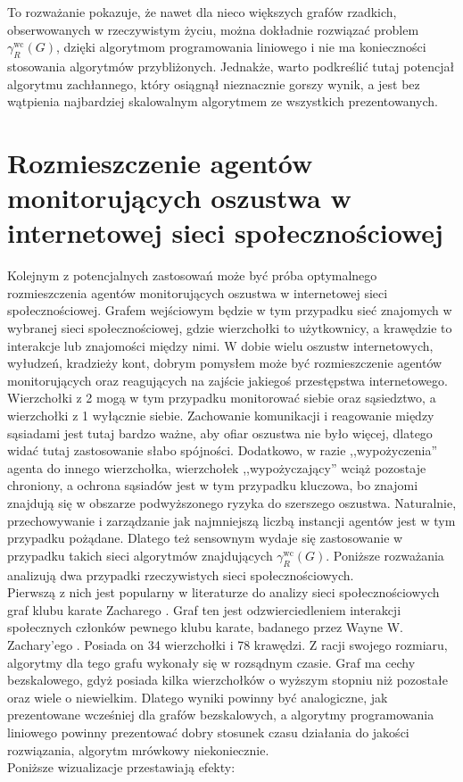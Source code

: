 To rozważanie pokazuje, że nawet dla nieco większych grafów rzadkich, obserwowanych w rzeczywistym życiu, można dokładnie rozwiązać problem $\gamma^{\text{wc}}_R(G)$, dzięki algorytmom programowania liniowego i nie ma konieczności stosowania algorytmów przybliżonych. Jednakże, warto podkreślić tutaj potencjał algorytmu zachłannego, który osiągnął nieznacznie gorszy wynik, a jest bez wątpienia najbardziej skalowalnym algorytmem ze wszystkich prezentowanych.

\section{Rozmieszczenie agentów monitorujących oszustwa w internetowej sieci społecznościowej}

Kolejnym z potencjalnych zastosowań może być próba optymalnego rozmieszczenia agentów monitorujących oszustwa w internetowej sieci społecznościowej. Grafem wejściowym będzie w tym przypadku sieć znajomych w wybranej sieci społecznościowej, gdzie wierzchołki to użytkownicy, a krawędzie to interakcje lub znajomości między nimi. W dobie wielu oszustw internetowych, wyłudzeń, kradzieży kont, dobrym pomysłem może być rozmieszczenie agentów monitorujących oraz reagujących na zajście jakiegoś przestępstwa internetowego. Wierzchołki z 2 mogą w tym przypadku monitorować siebie oraz sąsiedztwo, a wierzchołki z 1 wyłącznie siebie. Zachowanie komunikacji i reagowanie między sąsiadami jest tutaj bardzo ważne, aby ofiar oszustwa nie było więcej, dlatego widać tutaj zastosowanie słabo spójności. Dodatkowo, w razie ,,wypożyczenia'' agenta do innego wierzchołka, wierzchołek ,,wypożyczający'' wciąż pozostaje chroniony, a ochrona sąsiadów jest w tym przypadku kluczowa, bo znajomi znajdują się w obszarze podwyższonego ryzyka do szerszego oszustwa. Naturalnie, przechowywanie i zarządzanie jak najmniejszą liczbą instancji agentów jest w tym przypadku pożądane. Dlatego też sensownym wydaje się zastosowanie w przypadku takich sieci algorytmów znajdujących $\gamma^{\text{wc}}_R(G)$. Poniższe rozważania analizują dwa przypadki rzeczywistych sieci społecznościowych.\\

 Pierwszą z nich jest popularny w literaturze do analizy sieci społecznościowych graf klubu karate Zacharego \cite{KARATE}. Graf ten jest odzwierciedleniem interakcji społecznych członków pewnego klubu karate, badanego przez Wayne W. Zachary'ego \cite{ZACHARY}. Posiada on 34 wierzchołki i 78 krawędzi. Z racji swojego rozmiaru, algorytmy dla tego grafu wykonały się w rozsądnym czasie. Graf ma cechy bezskalowego, gdyż posiada kilka wierzchołków o wyższym stopniu niż pozostałe oraz wiele o niewielkim. Dlatego wyniki powinny być analogiczne, jak prezentowane wcześniej dla grafów bezskalowych, a algorytmy programowania liniowego powinny prezentować dobry stosunek czasu działania do jakości rozwiązania, algorytm mrówkowy niekoniecznie. \\
 Poniższe wizualizacje przestawiają efekty:

